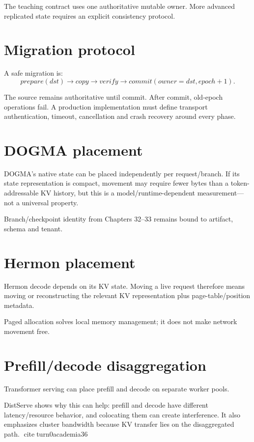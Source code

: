 The teaching contract uses one authoritative mutable owner. More advanced replicated state requires an explicit consistency protocol.

\section{Migration protocol}
A safe migration is:
\[
prepare(dst)\rightarrow copy\rightarrow verify\rightarrow commit(owner=dst,epoch+1).
\]

The source remains authoritative until commit. After commit, old-epoch operations fail. A production implementation must define transport authentication, timeout, cancellation and crash recovery around every phase.

\section{DOGMA placement}
DOGMA's native state can be placed independently per request/branch. If its state representation is compact, movement may require fewer bytes than a token-addressable KV history, but this is a model/runtime-dependent measurement—not a universal property.

Branch/checkpoint identity from Chapters 32--33 remains bound to artifact, schema and tenant.

\section{Hermon placement}
Hermon decode depends on its KV state. Moving a live request therefore means moving or reconstructing the relevant KV representation plus page-table/position metadata.

Paged allocation solves local memory management; it does not make network movement free.

\section{Prefill/decode disaggregation}
Transformer serving can place prefill and decode on separate worker pools.

DistServe shows why this can help: prefill and decode have different latency/resource behavior, and colocating them can create interference. It also emphasizes cluster bandwidth because KV transfer lies on the disaggregated path. citeturn0academia36

